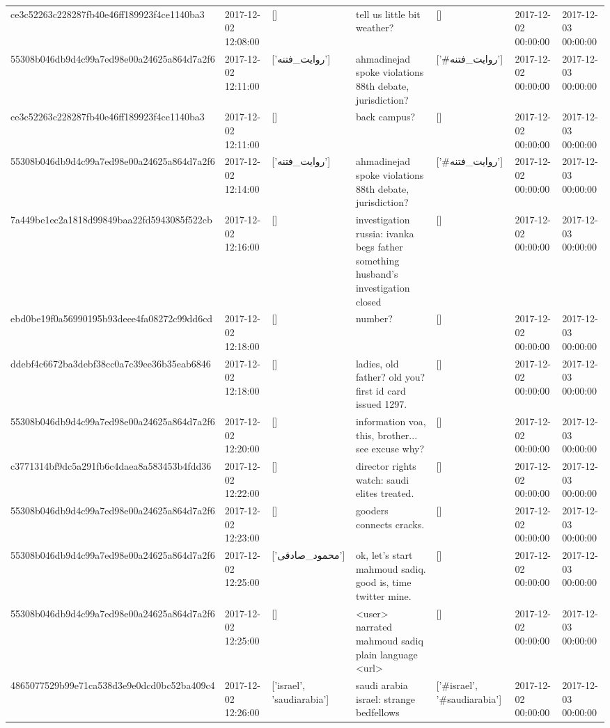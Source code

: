 \begin{tabular}{lllllll}
ce3c52263c228287fb40e46ff189923f4ce1140ba3 & 2017-12-02 12:08:00 & [] & tell us little bit weather? & [] & 2017-12-02 00:00:00 & 2017-12-03 00:00:00 \\
55308b046db9d4c99a7ed98e00a24625a864d7a2f6 & 2017-12-02 12:11:00 & ['روایت_فتنه'] & ahmadinejad spoke violations 88th debate, jurisdiction? & ['#روایت_فتنه'] & 2017-12-02 00:00:00 & 2017-12-03 00:00:00 \\
ce3c52263c228287fb40e46ff189923f4ce1140ba3 & 2017-12-02 12:11:00 & [] & back campus? & [] & 2017-12-02 00:00:00 & 2017-12-03 00:00:00 \\
55308b046db9d4c99a7ed98e00a24625a864d7a2f6 & 2017-12-02 12:14:00 & ['روایت_فتنه'] & ahmadinejad spoke violations 88th debate, jurisdiction? & ['#روایت_فتنه'] & 2017-12-02 00:00:00 & 2017-12-03 00:00:00 \\
7a449be1ec2a1818d99849baa22fd5943085f522cb & 2017-12-02 12:16:00 & [] & investigation russia: ivanka begs father something husband's investigation closed & [] & 2017-12-02 00:00:00 & 2017-12-03 00:00:00 \\
ebd0be19f0a56990195b93deee4fa08272c99dd6cd & 2017-12-02 12:18:00 & [] & number? & [] & 2017-12-02 00:00:00 & 2017-12-03 00:00:00 \\
ddebf4c6672ba3debf38cc0a7c39ee36b35eab6846 & 2017-12-02 12:18:00 & [] & ladies, old father? old you? first id card issued 1297. & [] & 2017-12-02 00:00:00 & 2017-12-03 00:00:00 \\
55308b046db9d4c99a7ed98e00a24625a864d7a2f6 & 2017-12-02 12:20:00 & [] & information voa, this, brother... see excuse why? & [] & 2017-12-02 00:00:00 & 2017-12-03 00:00:00 \\
c3771314bf9dc5a291fb6c4daea8a583453b4fdd36 & 2017-12-02 12:22:00 & [] & director rights watch: saudi elites treated. & [] & 2017-12-02 00:00:00 & 2017-12-03 00:00:00 \\
55308b046db9d4c99a7ed98e00a24625a864d7a2f6 & 2017-12-02 12:23:00 & [] & gooders connects cracks. & [] & 2017-12-02 00:00:00 & 2017-12-03 00:00:00 \\
55308b046db9d4c99a7ed98e00a24625a864d7a2f6 & 2017-12-02 12:25:00 & ['محمود_صادقی'] & ok, let's start mahmoud sadiq. good is, time twitter mine. & [] & 2017-12-02 00:00:00 & 2017-12-03 00:00:00 \\
55308b046db9d4c99a7ed98e00a24625a864d7a2f6 & 2017-12-02 12:25:00 & [] & <user> narrated mahmoud sadiq plain language <url> & [] & 2017-12-02 00:00:00 & 2017-12-03 00:00:00 \\
4865077529b99e71ca538d3e9e0dcd0bc52ba409c4 & 2017-12-02 12:26:00 & ['israel', 'saudiarabia'] & saudi arabia israel: strange bedfellows & ['#israel', '#saudiarabia'] & 2017-12-02 00:00:00 & 2017-12-03 00:00:00 \\

\end{tabular}
